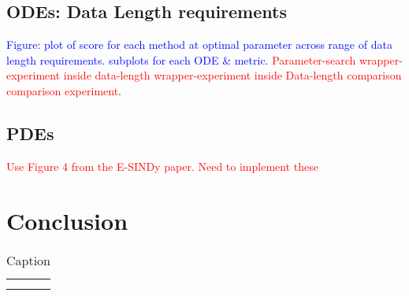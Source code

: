 \documentclass{article}
\begin{document}
\subsection{ODEs: Data Length requirements}
\textcolor{blue}{Figure: plot of score for each method at optimal parameter across range of data length requirements.  subplots for each ODE \& metric}.  \textcolor{red}{Parameter-search wrapper-experiment inside data-length wrapper-experiment inside Data-length comparison comparison experiment}.
\subsection{PDEs}
\textcolor{red}{Use Figure 4 from the E-SINDy paper. Need to implement these}
\section{Conclusion}
\begin{table}[]
    \centering
    \begin{tabular}{c|c}
         &  \\
         & 
    \end{tabular}
    \caption{Caption}
    \label{tab:my_label}
\end{table}
\end{document}
